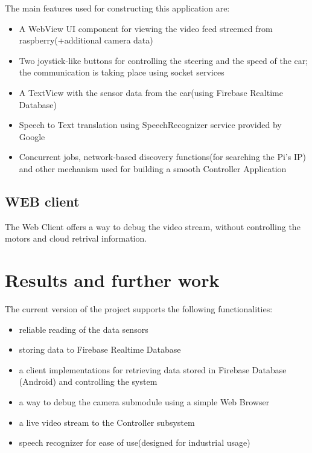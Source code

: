 \documentclass[a4paper,11pt]{article}
\begin{document}
The main features used for constructing this application are:
\begin{itemize} 
\item A WebView UI component for viewing the video feed streemed from raspberry(+additional camera data)
\item Two joystick-like buttons for controlling the steering and the speed of the car; the communication is taking place using socket services
\item A TextView with the sensor data from the car(using Firebase Realtime Database)
\item Speech to Text translation using SpeechRecognizer service provided by Google
\item Concurrent jobs, network-based discovery functions(for searching the Pi's IP) and other mechanism used for building a smooth Controller Application
\end{itemize}

\subsection{WEB client}

The Web Client offers a way to debug the video stream, without controlling the motors and cloud retrival information.\\


\section{Results and further work}

The current version of the project supports the following functionalities:
\begin{itemize}  
\item reliable reading of the data sensors
\item storing data to Firebase Realtime Database
\item a client implementations for retrieving data stored in Firebase Database (Android) and controlling the system
\item a way to debug the camera submodule using a simple Web Browser
\item a live video stream to the Controller subsystem
\item speech recognizer for ease of use(designed for industrial usage)
\end{itemize}
\end{document}
